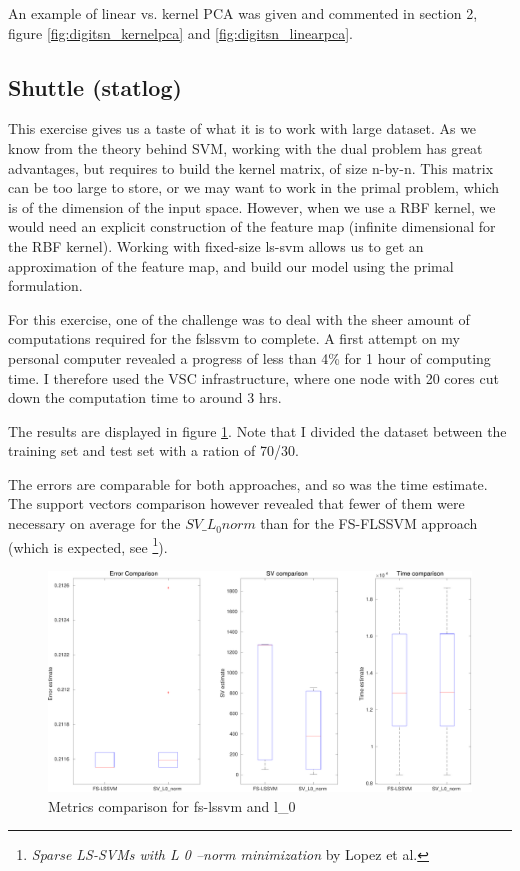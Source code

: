 \documentclass[11pt, a4paper]{article}
\begin{document}
An example of linear vs. kernel PCA was given and commented in section
2, figure \ref{fig:digitsn_kernelpca} and \ref{fig:digitsn_linearpca}. 

\subsection{Shuttle (statlog)}

This exercise gives us a taste of what it is to work with large
dataset. As we know from the theory behind SVM, working with the dual
problem has great advantages, but requires to build the kernel matrix,
of size n-by-n. This matrix can be too large to store, or we may want
to work in the primal problem, which is of the dimension of the input
space. However, when we use a RBF kernel, we would need an explicit
construction of the feature map (infinite dimensional for the RBF
kernel). Working with fixed-size ls-svm allows us to get an
approximation of the feature map, and build our model using the primal
formulation.

For this exercise, one of the challenge was to deal with the sheer
amount of computations required for the fslssvm to complete. A first
attempt on my personal computer revealed a progress of less than 4\%
for 1 hour of computing time. I therefore used the VSC infrastructure,
where one node with 20 cores cut down the computation time to around 3
hrs.

The results are displayed in figure \ref{fig:fslssvm_shuttle}. Note
that I divided the dataset between the training set and test set with
a ration of 70/30.

The errors are comparable for both approaches, and so was the time
estimate. The support vectors comparison however revealed that fewer
of them were necessary on average for the $SV\_L_0 norm$ than for the
FS-FLSSVM approach (which is expected, see \footnote{\emph{Sparse
    LS-SVMs with L 0 –norm minimization} by Lopez et al.}).

\begin{figure}[H]
  \centering
  \includegraphics[scale=.36]{fslssvm_shuttle.pdf}
  \caption{Metrics comparison for fs-lssvm and l\_0}
  \label{fig:fslssvm_shuttle}
\end{figure}
\end{document}

